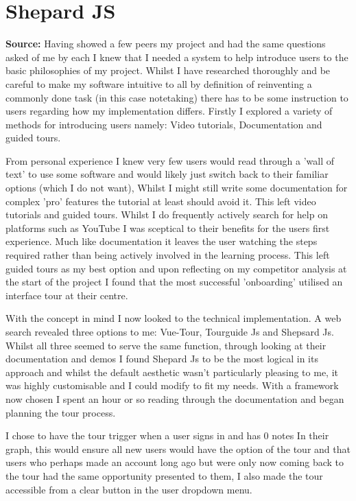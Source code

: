 \section{Shepard JS}
\label{research:ShepardJS}
\textbf{Source:} \cite{ShepherdjsDocs}
Having showed a few peers my project and had the same questions asked of me by each I knew that I needed a system to help introduce users to the basic philosophies of my project. Whilst I have researched thoroughly and be careful to make my software intuitive to all by definition of reinventing a commonly done task (in this case notetaking) there has to be some instruction to users regarding how my implementation differs. Firstly I explored a variety of methods for introducing users namely: Video tutorials, Documentation and guided tours.

From personal experience I knew very few users would read through a 'wall of text' to use some software and would likely just switch back to their familiar options (which I do not want), Whilst I might still write some documentation for complex 'pro' features the tutorial at least should avoid it. This left video tutorials and guided tours. Whilst I do frequently actively search for help on platforms such as YouTube I was sceptical to their benefits for the users first experience. Much like documentation it leaves the user watching the steps required rather than being actively involved in the learning process. This left guided tours as my best option and upon reflecting on my competitor analysis at the start of the project I found that the most successful 'onboarding' utilised an interface tour at their centre.

With the concept in mind I now looked to the technical implementation. A web search revealed three options to me: Vue-Tour, Tourguide Js and Shepsard Js. Whilst all three seemed to serve the same function, through looking at their documentation and demos I found Shepard Js to be the most logical in its approach and whilst the default aesthetic wasn’t particularly pleasing to me, it was highly customisable and I could modify to fit my needs. With a framework now chosen I spent an hour or so reading through the documentation \cite{ShepherdjsDocs} and began planning the tour process.

I chose to have the tour trigger when a user signs in and has 0 notes In their graph, this would ensure all new users would have the option of the tour and that users who perhaps made an account long ago but were only now coming back to the tour had the same opportunity presented to them, I also made the tour accessible from a clear button in the user dropdown menu.

